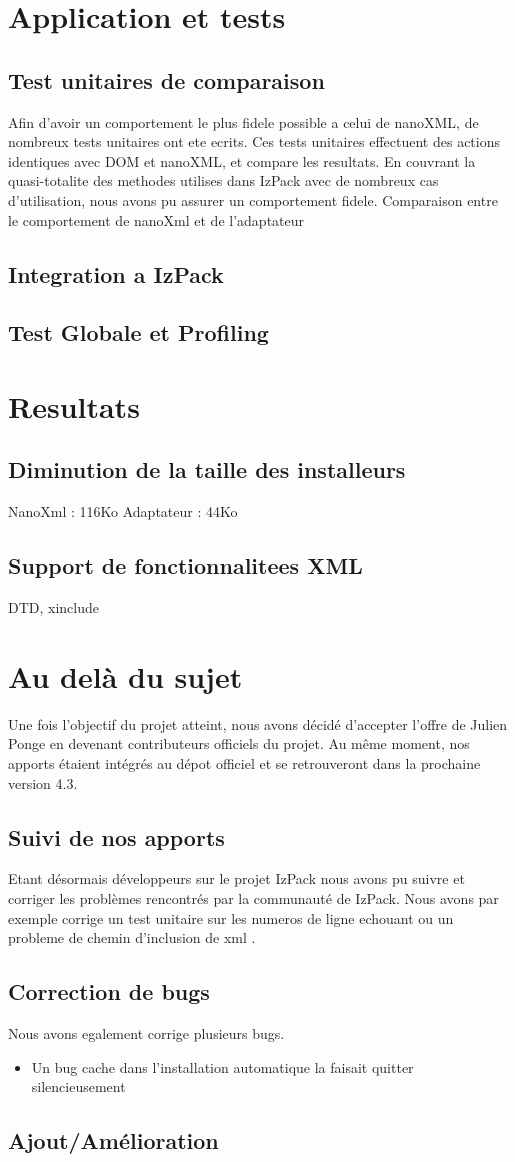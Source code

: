 \section{Application et tests}
\subsection{Test unitaires de comparaison}
Afin d'avoir un comportement le plus fidele possible a celui de nanoXML, de nombreux tests unitaires ont ete ecrits.
Ces tests unitaires effectuent des actions identiques avec DOM et nanoXML, et compare les resultats.
En couvrant la quasi-totalite des methodes utilises dans IzPack avec de nombreux cas d'utilisation, nous avons pu assurer un comportement fidele.
Comparaison entre le comportement de nanoXml et de l'adaptateur
\subsection{Integration a IzPack}
\subsection{Test Globale et Profiling}

\section{Resultats}
\subsection{Diminution de la taille des installeurs}
NanoXml : 116Ko
Adaptateur : 44Ko
\subsection{Support de fonctionnalitees XML}
DTD, xinclude

\section{Au delà du sujet}
Une fois l'objectif du projet atteint, nous avons décidé d'accepter l'offre de Julien Ponge en devenant contributeurs officiels du projet. Au même moment, nos apports étaient intégrés au dépot officiel et se retrouveront dans la prochaine version 4.3.

\subsection{Suivi de nos apports}
Etant désormais développeurs sur le projet IzPack nous avons pu suivre et corriger les problèmes rencontrés par la communauté de IzPack.
Nous avons par exemple corrige un test unitaire sur les numeros de ligne echouant \cite{IZPACK-306} ou un probleme de chemin d'inclusion de xml \cite{IZPACK-303}.

\subsection{Correction de bugs}
Nous avons egalement corrige plusieurs bugs.
\begin{itemize}
 \item Un bug cache dans l'installation automatique la faisait quitter silencieusement \cite{IZPACK-309}
\end{itemize}

\subsection{Ajout/Amélioration}
